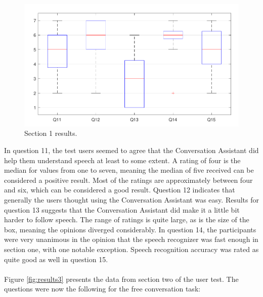 \documentclass[english, 12pt, a4paper, pdftex, elec, utf8]{aaltothesis}
\begin{document}
\begin{figure}[h!]
    \centering
    \includegraphics[width=\textwidth]{T2_box2.pdf}
    \caption{Section 1 results.}
    \label{fig:results2} 
\end{figure}
In question 11, the test users seemed to agree that the Conversation Assistant did help them understand speech at least to some extent. A rating of four is the median for values from one to seven, meaning the median of five received can be considered a positive result. Most of the ratings are approximately between four and six, which can be considered a good result. Question 12 indicates that generally the users thought using the Conversation Assistant was easy. Results for question 13 suggests that the Conversation Assistant did make it a little bit harder to follow speech. The range of ratings is quite large, as is the size of the box, meaning the opinions diverged considerably. In question 14, the participants were very unanimous in the opinion that the speech recognizer was fast enough in section one, with one notable exception. Speech recognition accuracy was rated as quite good as well in question 15. \\\\
Figure \ref{fig:results3} presents the data from section two of the user test. The questions were now the following for the free conversation task:
\end{document}
